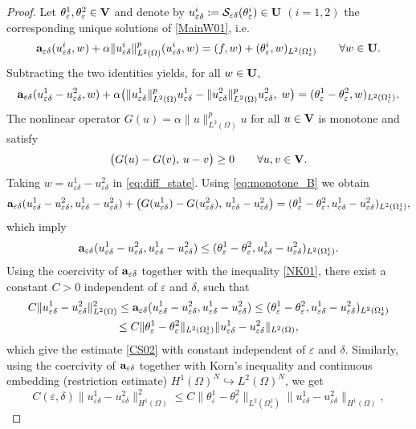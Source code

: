\documentclass[11pt,a4paper]{article}
\numberwithin{equation}{section}
\def\O{\Omega}
\def\d{\delta}
\def\e{\varepsilon}
\def\a{{\alpha}}
\def\Ga{{\bf a}}
\def\R{{\mathbb{R}}}
\def\R{{\mathbb{R}}}
\def\Sc{{\mathcal{S}}}
\def\ed{{\varepsilon\delta}}
\def\Ga{{\bf a}}
\def\GU{{\bf U}}
\def\GV{{\bf V}}
\begin{document}
\begin{proof}
	Let $\theta_\e^1,\theta_\e^2\in \GV$ and denote by
	$u_\ed^i:=\Sc_\ed(\theta_\e^i)\in\GU$ $(i=1,2)$ the corresponding unique solutions of \eqref{MainW01}, i.e.
	\[
	\Ga_\ed(u_\ed^i,w)+\a\|u_\ed^i\|_{L^2(\O)}^{p}(u_\ed^i,w)
	=(f,w)+(\theta_\e^i,w)_{L^2(\O_\e^1)}
	\qquad\forall w\in\GU.
	\]
	Subtracting the two identities yields, for all $w\in\GU$,
	\begin{equation}\label{eq:diff_state}
		\Ga_\ed(u^1_\ed-u^2_\ed,w)
		+\a\big(\|u_\ed^1\|_{L^2(\O)}^{p}u_\ed^1-\|u_\ed^2\|_{L^2(\O)}^{p}u_\ed^2,\;w\big)
		=(\theta^1_\e-\theta^2_\e,w)_{L^2(\O_\e^1)}.
	\end{equation}
%	
	The nonlinear operator $G(u)=\a\|u\|_{L^2(\O)}^{p}u$ for all $u\in\GV$ is monotone and satisfy
	\begin{equation}\label{eq:monotone_B}
		\big(G(u)-G(v),\,u-v\big)\ge 0
		\qquad\forall u,v\in \GV.
	\end{equation}
	Taking $w=u^1_\ed-u^2_\ed$ in \eqref{eq:diff_state}. Using \eqref{eq:monotone_B} we obtain
	\[
	\Ga_\ed(u^1_\ed-u^2_\ed,u^1_\ed-u^2_\ed)
	+\big(G(u_\ed^1)-G(u_\ed^2),\,u^1_\ed-u^2_\ed\big)
	=(\theta^1_\e-\theta^2_\e,u^1_\ed-u^2_\ed)_{L^2(\O_\e^1)},\]
	which imply
	\[\Ga_\ed(u^1_\ed-u^2_\ed,u^1_\ed-u^2_\ed)\le (\theta^1_\e-\theta^2_\e,u^1_\ed-u^2_\ed)_{L^2(\O_\e^1)}.\]
	Using the coercivity of $\Ga_\ed$ together with the inequality \eqref{NK01}, there exist a constant $C>0$ independent of $\e$ and $\d$, such that
	\begin{multline*}
		C\|u^1_\ed-u^2_\ed\|^2_{L^2(\O)}\leq \Ga_\ed(u^1_\ed-u^2_\ed,u^1_\ed-u^2_\ed)\le (\theta^1_\e-\theta^2_\e,u^1_\ed-u^2_\ed)_{L^2(\O_\e^1)}\\
		\leq C\|\theta^1_\e-\theta^2_\e\|_{L^2(\O^1_\e)}\|u^1_\ed-u^2_\ed\|_{L^2(\O)},
	\end{multline*}
	which give the estimate \eqref{CS02} with constant independent of $\e$ and $\d$. Similarly, using the coercivity of $\Ga_\ed$ together with Korn's inequality and continuous embedding (restriction estimate) $H^1(\O)^N\hookrightarrow L^2(\O)^N$, we get
	$$C(\e,\d)\|u^1_\ed-u^2_\ed\|^2_{H^1(\O)}\leq C\|\theta^1_\e-\theta^2_\e\|_{L^2(\O^1_\e)}\|u^1_\ed-u^2_\ed\|_{H^1(\O)},$$

\end{proof}
\end{document}
